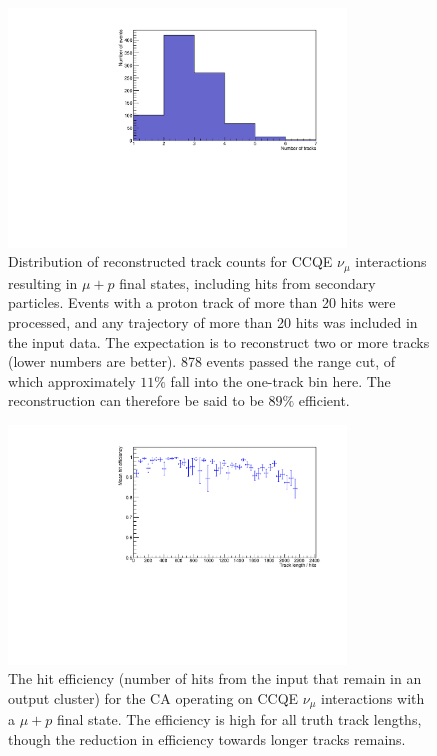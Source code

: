 \begin{figure}
    \centering
    \includegraphics[angle=-90,width=0.8\textwidth]{chapters/cellularautomaton_images/ccqe-trackcount}
    \caption[Number of reconstructed tracks in CCQE events]{\label{fig:ca-ccqe-full-trackcounts}Distribution of reconstructed track counts for CCQE $\nu_\mu$ interactions resulting in $\mu + p$ final states, including hits from secondary particles. Events with a proton track of more than 20 hits were processed, and any trajectory of more than 20 hits was included in the input data. The expectation is to reconstruct two or more tracks (lower numbers are better). 878 events passed the range cut, of which approximately $11\%$ fall into the one-track bin here. The reconstruction can therefore be said to be $89\%$ efficient.}
\end{figure}

\begin{figure}
    \centering
    \includegraphics[angle=-90,width=0.8\textwidth]{chapters/cellularautomaton_images/ccqe-efficiency}
    \caption[Hit efficiency for CCQE events reconstructed with a CA]{\label{fig:ca-ccqe-full-efficiency}The hit efficiency (number of hits from the input that remain in an output cluster) for the CA operating on CCQE $\nu_\mu$ interactions with a $\mu + p$ final state. The efficiency is high for all truth track lengths, though the reduction in efficiency towards longer tracks remains.}
\end{figure}

